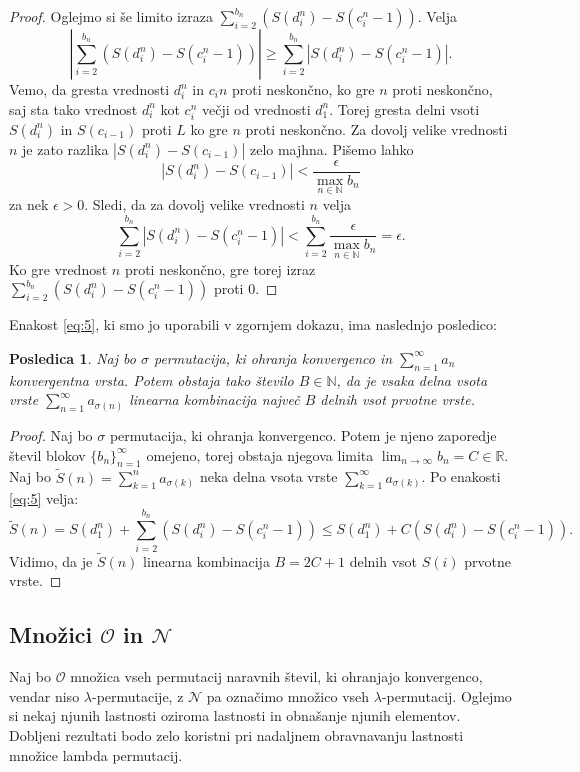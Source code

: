 \documentclass[12pt,a4paper,reqno]{amsart}
\theoremstyle{definition} %
\theoremstyle{plain} %
\newtheorem{posledica}[definicija]{Posledica}
\newcommand{\R}{\mathbb R}
\newcommand{\N}{\mathbb N}
\begin{document}
\begin{proof}
Oglejmo si še limito izraza $\sum_{i=2}^{b_n}(S(d_i^n)-S(c_i^n-1))$. Velja $$|\sum_{i=2}^{b_n}(S(d_i^n)-S(c_i^n-1))|\geq \sum_{i=2}^{b_n}|S(d_i^n)-S(c_i^n-1)|.$$
Vemo, da gresta vrednosti $d_i^n$ in $c_in$ proti neskončno, ko gre $n$ proti neskončno, saj sta tako vrednost $d_i^n$ kot $c_i^n$ večji od vrednosti $d_1^n$. Torej gresta delni vsoti $S(d_i^n)$ in $S(c_{i-1})$ proti $L$ ko gre $n$ proti neskončno. Za dovolj velike vrednosti $n$ je zato razlika $|S(d_i^n)-S(c_{i-1})|$ zelo majhna. Pišemo lahko $$|S(d_i^n)-S(c_{i-1})|<\frac{\epsilon}{\max_{n\in \N}b_n}$$ za nek $\epsilon>0$. Sledi, da za dovolj velike vrednosti $n$ velja $$\sum_{i=2}^{b_n}|S(d_i^n)-S(c_i^n-1)|<\sum_{i=2}^{b_n}\frac{\epsilon}{\max_{n\in \N}b_n}=\epsilon.$$
Ko gre vrednost $n$ proti neskončno, gre torej izraz $\sum_{i=2}^{b_n}(S(d_i^n)-S(c_i^n-1))$ proti $0$.
\end{proof}

Enakost \ref{eq:5}, ki smo jo uporabili v zgornjem dokazu, ima naslednjo posledico:
\begin{posledica}
Naj bo $\sigma$ permutacija, ki ohranja konvergenco in $\sum^{\infty}_{n=1}a_n$ konvergentna vrsta. Potem obstaja tako število $B\in \mathbb{N}$, da je vsaka delna vsota vrste $\sum^{\infty}_{n=1}a_{\sigma(n)}$ linearna kombinacija največ $B$ delnih vsot prvotne vrste.
\end{posledica}

\begin{proof}
Naj bo $\sigma$ permutacija, ki ohranja konvergenco. Potem je njeno zaporedje števil blokov $\{b_n\}_{n=1}^{\infty}$ omejeno, torej obstaja njegova limita $\lim_{n \to \infty}b_n = C\in \R$. Naj bo $\tilde{S}(n)=\sum_{k=1}^{n}a_{\sigma(k)}$ neka delna vsota vrste $\sum_{k=1}^{\infty}a_{\sigma(k)}$. Po enakosti \ref{eq:5} velja: $$\tilde{S}(n)=S(d_1^n)+\sum_{i=2}^{b_n}(S(d_i^n)-S(c_i^n-1))\leq S(d_1^n)+C(S(d_i^n)-S(c_i^n-1)).$$ Vidimo, da je $\tilde{S}(n)$ linearna kombinacija $B=2C+1$ delnih vsot $S(i)$ prvotne vrste.
\end{proof}

\subsection{Množici $\mathcal{O}$ in $\mathcal{N}$}

Naj bo $\mathcal{O}$ množica vseh permutacij naravnih števil, ki ohranjajo konvergenco, vendar niso $\lambda$-permutacije, z $\mathcal{N}$ pa označimo množico vseh $\lambda$-permutacij. Oglejmo si nekaj njunih lastnosti oziroma lastnosti in obnašanje njunih elementov. Dobljeni rezultati bodo zelo koristni pri nadaljnem obravnavanju lastnosti množice lambda permutacij.
\end{document}
